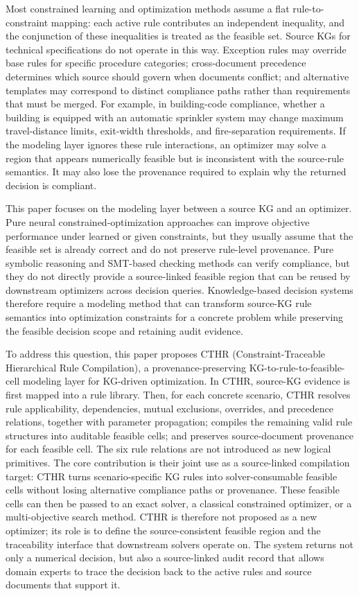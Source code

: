﻿\documentclass[a4paper,fleqn]{cas-dc}
\newcommand{\CTHR}{\textsc{CTHR}}
\begin{document}
Most constrained learning and optimization methods assume a flat
rule-to-constraint mapping: each active rule contributes an independent
inequality, and the conjunction of these inequalities is treated as the
feasible set. Source KGs for technical specifications do not operate in this
way. Exception rules may override base rules for specific procedure categories;
cross-document precedence determines which source should govern when documents
conflict; and alternative templates may correspond to distinct compliance
paths rather than requirements that must be merged. For example, in
building-code compliance, whether a building is equipped with an automatic
sprinkler system may change maximum travel-distance limits, exit-width
thresholds, and fire-separation requirements. If the modeling layer ignores
these rule interactions, an optimizer may solve a region that appears
numerically feasible but is inconsistent with the source-rule semantics. It may
also lose the provenance required to explain why the returned decision is
compliant.

This paper focuses on the modeling layer between a source KG and an optimizer.
Pure neural constrained-optimization approaches \cite{donti2021dc3,navon2021learning}
can improve objective performance under learned or given constraints, but they
usually assume that the feasible set is already correct and do not preserve
rule-level provenance. Pure symbolic reasoning and SMT-based checking methods
\cite{de2008z3} can verify compliance, but they do not directly provide a
source-linked feasible region that can be reused by downstream optimizers
across decision queries. Knowledge-based decision systems therefore require a
modeling method that can transform source-KG rule semantics into optimization
constraints for a concrete problem while preserving the feasible decision scope
and retaining audit evidence.

To address this question, this paper proposes \CTHR{} (Constraint-Traceable Hierarchical
Rule Compilation), a provenance-preserving KG-to-rule-to-feasible-cell modeling
layer for KG-driven optimization. In \CTHR{}, source-KG evidence is first mapped
into a rule library. Then, for each concrete scenario, \CTHR{} resolves rule
applicability, dependencies, mutual exclusions, overrides, and precedence
relations, together with parameter propagation; compiles the remaining valid
rule structures into auditable feasible cells; and preserves source-document
provenance for each feasible cell. The
six rule relations are not introduced as new logical primitives. The core
contribution is their joint use as a source-linked compilation target: \CTHR{}
turns scenario-specific KG rules into solver-consumable feasible cells without
losing alternative compliance paths or provenance.
These feasible cells can then be passed to an exact solver, a classical
constrained optimizer, or a multi-objective search method. \CTHR{} is therefore not proposed
as a new optimizer; its role is to define the source-consistent feasible region
and the traceability interface that downstream solvers operate on. The system
returns not only a numerical decision, but also a source-linked audit record
that allows domain experts to trace the decision back to the active rules and
source documents that support it.
\end{document}
